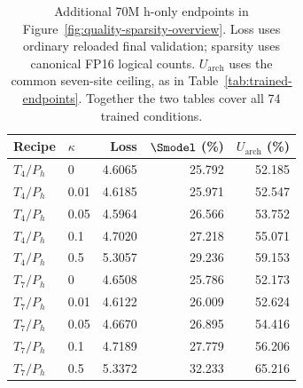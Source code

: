 \begin{table}[!htbp]
\centering\small
\caption{Additional 70M h-only endpoints in Figure~\ref{fig:quality-sparsity-overview}. Loss uses ordinary reloaded final validation; sparsity uses canonical FP16 logical counts. $U_{\mathrm{arch}}$ uses the common seven-site ceiling, as in Table~\ref{tab:trained-endpoints}. Together the two tables cover all 74 trained conditions.}
\label{tab:70m-h-only-endpoints}
\begin{tabular}{@{}llrrr@{}}
\toprule
Recipe & $\kappa$ & Loss & $\Smodel$ (\%) & $U_{\mathrm{arch}}$ (\%) \\
\midrule
$T_4/P_h$ & 0 & 4.6065 & 25.792 & 52.185 \\
$T_4/P_h$ & 0.01 & 4.6185 & 25.971 & 52.547 \\
$T_4/P_h$ & 0.05 & 4.5964 & 26.566 & 53.752 \\
$T_4/P_h$ & 0.1 & 4.7020 & 27.218 & 55.071 \\
$T_4/P_h$ & 0.5 & 5.3057 & 29.236 & 59.153 \\
$T_7/P_h$ & 0 & 4.6508 & 25.786 & 52.173 \\
$T_7/P_h$ & 0.01 & 4.6122 & 26.009 & 52.624 \\
$T_7/P_h$ & 0.05 & 4.6670 & 26.895 & 54.416 \\
$T_7/P_h$ & 0.1 & 4.7189 & 27.779 & 56.206 \\
$T_7/P_h$ & 0.5 & 5.3372 & 32.233 & 65.216 \\
\bottomrule
\end{tabular}
\end{table}
